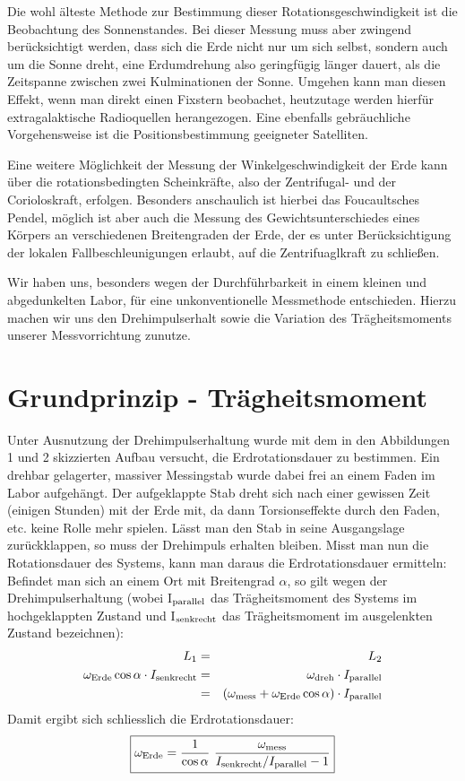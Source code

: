 \documentclass[11pt]{scrartcl}
\newcommand{\ltext}[1]{\ensuremath{_{\textnormal{#1}}}}
\begin{document}
Die wohl älteste Methode zur Bestimmung dieser Rotationsgeschwindigkeit ist die Beobachtung des Sonnenstandes.
Bei dieser Messung muss aber zwingend berücksichtigt werden, dass sich die Erde nicht nur um sich selbst, sondern auch um die Sonne dreht, eine Erdumdrehung also geringfügig länger dauert, als die Zeitspanne zwischen zwei Kulminationen der Sonne. Umgehen kann man diesen Effekt, wenn man direkt einen Fixstern beobachet, heutzutage werden hierfür extragalaktische Radioquellen herangezogen. Eine ebenfalls gebräuchliche Vorgehensweise ist die Positionsbestimmung geeigneter Satelliten.

Eine weitere Möglichkeit der Messung der Winkelgeschwindigkeit der Erde kann über die rotationsbedingten Scheinkräfte, also der Zentrifugal- und der Corioloskraft, erfolgen. Besonders anschaulich ist hierbei das Foucaultsches Pendel, möglich ist aber auch die Messung des Gewichtsunterschiedes eines Körpers an verschiedenen Breitengraden der Erde, der es unter Berücksichtigung der lokalen Fallbeschleunigungen erlaubt, auf die Zentrifuaglkraft zu schließen. 

Wir haben uns, besonders wegen der Durchführbarkeit in einem kleinen und abgedunkelten Labor, für eine unkonventionelle Messmethode entschieden. Hierzu machen wir uns den Drehimpulserhalt sowie die Variation des Tr\"agheitsmoments unserer Messvorrichtung zunutze.

\section{Grundprinzip - Tr\"agheitsmoment}
Unter Ausnutzung der Drehimpulserhaltung wurde mit dem in den Abbildungen 1 und 2 skizzierten Aufbau versucht, die Erdrotationsdauer zu bestimmen. Ein drehbar gelagerter, massiver Messingstab wurde dabei frei an einem Faden im Labor aufgeh\"angt. Der aufgeklappte Stab dreht sich nach einer gewissen Zeit (einigen Stunden) mit der Erde mit, da dann Torsionseffekte durch den Faden, etc. keine Rolle mehr spielen. L\"asst man den Stab in seine Ausgangslage zur\"uckklappen, so muss der Drehimpuls erhalten bleiben. Misst man nun die Rotationsdauer des Systems, kann man daraus die Erdrotationsdauer ermitteln:
Befindet man sich an einem Ort mit Breitengrad $\alpha$, so gilt wegen der Drehimpulserhaltung (wobei I\ltext{parallel} das Tr\"agheitsmoment des Systems im hochgeklappten Zustand und I\ltext{senkrecht} das Tr\"agheitsmoment im ausgelenkten Zustand bezeichnen):
\begin{eqnarray}
L_1 &=& L_2 \\
\omega\ltext{Erde}\cos\alpha \cdot I\ltext{senkrecht} &=&
\omega\ltext{dreh} \cdot I\ltext{parallel} \\
&=& (\omega\ltext{mess} + \omega\ltext{Erde}\cos\alpha) \cdot I\ltext{parallel}
\end{eqnarray}
Damit ergibt sich schliesslich die Erdrotationsdauer:
\begin{equation}
\boxed{
\omega\ltext{Erde} =
\frac{1}{\cos\alpha}\ 
\frac{\omega\ltext{mess}}{I\ltext{senkrecht} / I\ltext{parallel} - 1}
}
\end{equation}
\end{document}
